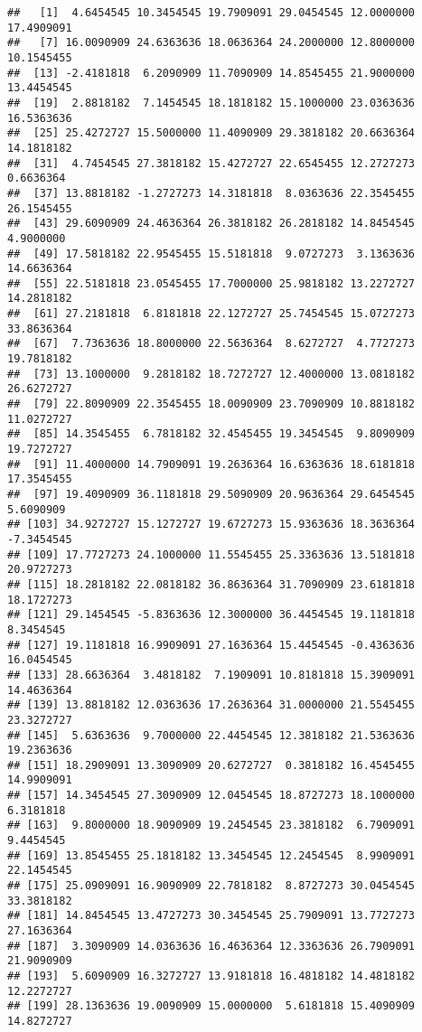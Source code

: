 \documentclass[]{book}
\begin{document}
\begin{verbatim}
##   [1]  4.6454545 10.3454545 19.7909091 29.0454545 12.0000000 17.4909091
##   [7] 16.0090909 24.6363636 18.0636364 24.2000000 12.8000000 10.1545455
##  [13] -2.4181818  6.2090909 11.7090909 14.8545455 21.9000000 13.4454545
##  [19]  2.8818182  7.1454545 18.1818182 15.1000000 23.0363636 16.5363636
##  [25] 25.4272727 15.5000000 11.4090909 29.3818182 20.6636364 14.1818182
##  [31]  4.7454545 27.3818182 15.4272727 22.6545455 12.2727273  0.6636364
##  [37] 13.8818182 -1.2727273 14.3181818  8.0363636 22.3545455 26.1545455
##  [43] 29.6090909 24.4636364 26.3818182 26.2818182 14.8454545  4.9000000
##  [49] 17.5818182 22.9545455 15.5181818  9.0727273  3.1363636 14.6636364
##  [55] 22.5181818 23.0545455 17.7000000 25.9818182 13.2272727 14.2818182
##  [61] 27.2181818  6.8181818 22.1272727 25.7454545 15.0727273 33.8636364
##  [67]  7.7363636 18.8000000 22.5636364  8.6272727  4.7727273 19.7818182
##  [73] 13.1000000  9.2818182 18.7272727 12.4000000 13.0818182 26.6272727
##  [79] 22.8090909 22.3545455 18.0090909 23.7090909 10.8818182 11.0272727
##  [85] 14.3545455  6.7818182 32.4545455 19.3454545  9.8090909 19.7272727
##  [91] 11.4000000 14.7909091 19.2636364 16.6363636 18.6181818 17.3545455
##  [97] 19.4090909 36.1181818 29.5090909 20.9636364 29.6454545  5.6090909
## [103] 34.9272727 15.1272727 19.6727273 15.9363636 18.3636364 -7.3454545
## [109] 17.7727273 24.1000000 11.5545455 25.3363636 13.5181818 20.9727273
## [115] 18.2818182 22.0818182 36.8636364 31.7090909 23.6181818 18.1727273
## [121] 29.1454545 -5.8363636 12.3000000 36.4454545 19.1181818  8.3454545
## [127] 19.1181818 16.9909091 27.1636364 15.4454545 -0.4363636 16.0454545
## [133] 28.6636364  3.4818182  7.1909091 10.8181818 15.3909091 14.4636364
## [139] 13.8818182 12.0363636 17.2636364 31.0000000 21.5545455 23.3272727
## [145]  5.6363636  9.7000000 22.4454545 12.3818182 21.5363636 19.2363636
## [151] 18.2909091 13.3090909 20.6272727  0.3818182 16.4545455 14.9909091
## [157] 14.3454545 27.3090909 12.0454545 18.8727273 18.1000000  6.3181818
## [163]  9.8000000 18.9090909 19.2454545 23.3818182  6.7909091  9.4454545
## [169] 13.8545455 25.1818182 13.3454545 12.2454545  8.9909091 22.1454545
## [175] 25.0909091 16.9090909 22.7818182  8.8727273 30.0454545 33.3818182
## [181] 14.8454545 13.4727273 30.3454545 25.7909091 13.7727273 27.1636364
## [187]  3.3090909 14.0363636 16.4636364 12.3363636 26.7909091 21.9090909
## [193]  5.6090909 16.3272727 13.9181818 16.4818182 14.4818182 12.2272727
## [199] 28.1363636 19.0090909 15.0000000  5.6181818 15.4090909 14.8272727

\end{verbatim}
\end{document}
